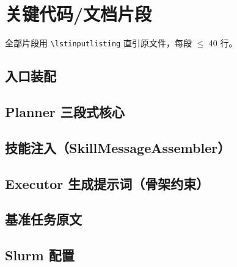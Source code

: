 \documentclass[UTF8]{ctexart}
\begin{document}
\section{关键代码/文档片段}

全部片段用 \texttt{\textbackslash lstinputlisting} 直引原文件，每段 $\le$ 40 行。

\subsection{入口装配}



\subsection{Planner 三段式核心}



\subsection{技能注入（SkillMessageAssembler）}



\subsection{Executor 生成提示词（骨架约束）}



\subsection{基准任务原文}



\subsection{Slurm 配置}
\end{document}
